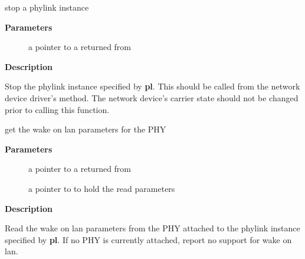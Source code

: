 \documentclass[a4paper,8pt,english]{sphinxmanual}
\begin{document}
\begin{fulllineitems}
\label{networking/kapi:c.phylink_stop}
stop a phylink instance

\end{fulllineitems}


\textbf{Parameters}
\begin{description}
\item[{}] \leavevmode
a pointer to a {\hyperref[networking/kapi:c.phylink]{\emph{}}} returned from {\hyperref[networking/kapi:c.phylink_create]{\emph{}}}

\end{description}

\textbf{Description}

Stop the phylink instance specified by \textbf{pl}. This should be called from the
network device driver's   method.  The
network device's carrier state should not be changed prior to calling this
function.

\begin{fulllineitems}
\label{networking/kapi:c.phylink_ethtool_get_wol}
get the wake on lan parameters for the PHY

\end{fulllineitems}


\textbf{Parameters}
\begin{description}
\item[{}] \leavevmode
a pointer to a {\hyperref[networking/kapi:c.phylink]{\emph{}}} returned from {\hyperref[networking/kapi:c.phylink_create]{\emph{}}}

\item[{}] \leavevmode
a pointer to  to hold the read parameters

\end{description}

\textbf{Description}

Read the wake on lan parameters from the PHY attached to the phylink
instance specified by \textbf{pl}. If no PHY is currently attached, report no
support for wake on lan.
\end{document}
